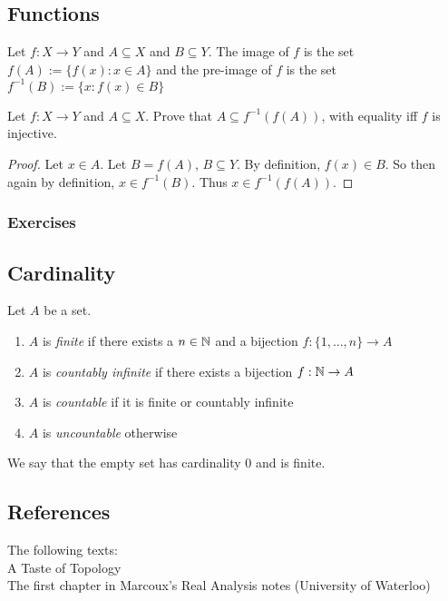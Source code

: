 \documentclass{article}
\begin{document}
\subsection{Functions}

\begin{definition}
Let $f:X \to Y$ and $A \subseteq X$ and $B \subseteq Y$. The image of $f$ is the set $f(A) := \{f(x): x \in A \}$ and the pre-image of $f$ is the set $f^{-1}(B) := \{x: f(x) \in B \}$
\end{definition}

\begin{example}
Let $f: X \to Y$ and $A \subseteq X$. Prove that $A \subseteq f^{-1}(f(A))$, with equality iff $f$ is injective. 
\end{example}
\begin{proof}
Let $x \in A$. Let $B = f(A)$, $B \subseteq Y$. By definition, $f(x) \in B$. So then again by definition, $x \in f^{-1}(B)$. Thus $x \in f^{-1}(f(A))$.
\end{proof}

\subsubsection{Exercises}


\subsection{Cardinality}
\begin{definition}
Let $A$ be a set. 
\begin{enumerate}
\item $A$ is \emph{finite} if there exists a $n \in {\mathbb{N}}$ and a bijection $f:\{1,\ldots,n\} \to A$
\item $A$ is \emph{countably infinite} if there exists a bijection $f:{\mathbb{N}}\to A$
\item $A$ is \emph{countable} if it is finite or countably infinite
\item $A$ is \emph{uncountable} otherwise
\end{enumerate}
\end{definition}

We say that the empty set has cardinality 0 and is finite.


\subsection{References}
The following texts: \\
A Taste of Topology \cite{tastetopology}\\
The first chapter in Marcoux's Real Analysis notes (University of Waterloo) \cite{marcoux2019}
\end{document}
